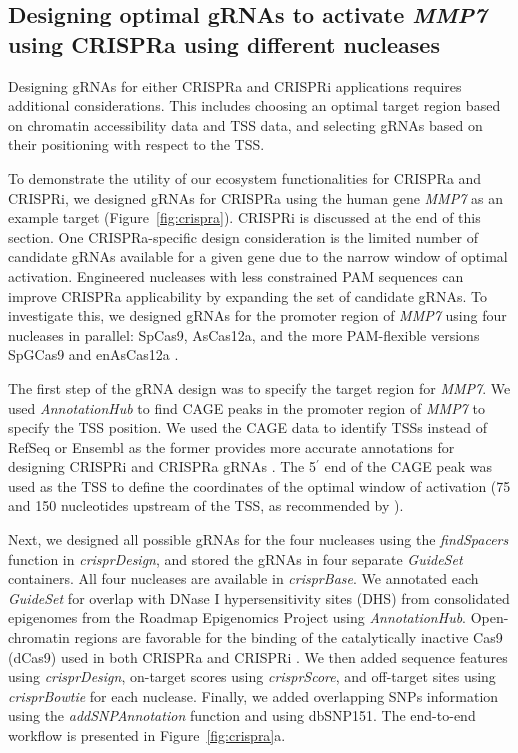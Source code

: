 \documentclass[pdftex,english,10pt]{article}
\begin{document}
\subsection{Designing optimal gRNAs to activate \textit{MMP7} using CRISPRa using different nucleases}

Designing gRNAs for either CRISPRa and CRISPRi applications requires additional considerations. This includes choosing an optimal target region based on chromatin accessibility data and TSS data, and selecting gRNAs based on their positioning with respect to the TSS. 

To demonstrate the utility of our ecosystem functionalities for CRISPRa and CRISPRi, we designed gRNAs for CRISPRa using the human gene \textit{MMP7} as an example target (Figure~\ref{fig:crispra}). CRISPRi is discussed at the end of this section. One CRISPRa-specific design consideration is the limited number of candidate gRNAs available for a given gene due to the narrow window of optimal activation. 
Engineered nucleases with less constrained PAM sequences can improve CRISPRa applicability by expanding the set of candidate gRNAs. 
To investigate this, we designed gRNAs for the promoter region of \textit{MMP7} using four nucleases in parallel: SpCas9, AsCas12a, and the more PAM-flexible versions SpGCas9 \citep{spg} and enAsCas12a \citep{enpamgb}. 

The first step of the gRNA design was to specify the target region for \textit{MMP7}. 
We used \textit{AnnotationHub} to find CAGE peaks in the promoter region of \textit{MMP7} to specify the TSS position. We used the CAGE data to identify TSSs instead of RefSeq or Ensembl as the former provides more accurate annotations for designing CRISPRi and CRISPRa gRNAs \citep{radzisheuskaya2016optimizing}.
The 5$^\prime$ end of the CAGE peak was used as the TSS to define the coordinates of the optimal window of activation (75 and 150 nucleotides upstream of the TSS, as recommended by \citet{sanson2018optimized}). 

Next, we designed all possible gRNAs for the four nucleases using the \textit{findSpacers} function in \textit{crisprDesign}, and stored the gRNAs in four separate \textit{GuideSet} containers. All four nucleases are available in \textit{crisprBase}. We annotated each \textit{GuideSet} for overlap with DNase I hypersensitivity sites (DHS) from consolidated epigenomes from the Roadmap Epigenomics Project \citep{kundaje2015integrative} using \textit{AnnotationHub}. Open-chromatin regions are favorable for the binding of the catalytically inactive Cas9 (dCas9) used in both CRISPRa and CRISPRi \citep{kuscu2014genome,wu2014genome}. We then added sequence features using \textit{crisprDesign}, on-target scores using \textit{crisprScore}, and off-target sites using \textit{crisprBowtie} for each nuclease. Finally, we added overlapping SNPs information using the \textit{addSNPAnnotation} function and using dbSNP151. The end-to-end workflow is presented in Figure~\ref{fig:crispra}a.
\end{document}
